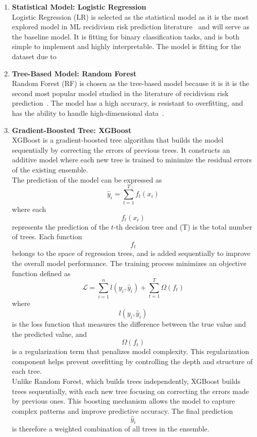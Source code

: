 \documentclass[12pt]{article}
\begin{document}
\begin{enumerate}
  \item \textbf{Statistical Model: Logistic Regression} \\
    \tab Logistic Regression (LR) is selected as the statistical model as it is the most explored model in ML recidivism risk prediction literature~\cite{travaini2022machine} and will serve as the baseline model. It is fitting for binary classification tasks, and is both simple to implement and highly interpretable. The model is fitting for the dataset due to 

  \item \textbf{Tree-Based Model: Random Forest}\\
    \tab Random Forest (RF) is chosen as the tree-based model because it is it is the second most popular model studied in the literature of recidivism risk prediction~\cite{travaini2022machine}. The model has a high accuracy, is resistant to overfitting, and has the ability to handle high-dimensional data~\cite{kovalchuk2023prediction}.

  \item \textbf{Gradient-Boosted Tree: XGBoost}\\
    \tab XGBoost is a gradient-boosted tree algorithm that builds the model sequentially by correcting the errors of previous trees. It constructs an additive model where each new tree is trained to minimize the residual errors of the existing ensemble.\\
    
    The prediction of the model can be expressed as \[ \hat{y}_i = \sum_{t=1}^{T} f_t(x_i) \] where each \[ f_t(x_i) \] represents the prediction of the \(t\)-th decision tree and (T) is the total number of trees. Each function \[ f_t \] belongs to the space of regression trees, and is added sequentially to improve the overall model performance. The training process minimizes an objective function defined as \[ \mathcal{L} = \sum_{i=1}^{n} l(y_i, \hat{y}_i) + \sum_{t=1}^{T} \Omega(f_t) \] where \[ l(y_i, \hat{y}_i) \] is the loss function that measures the difference between the true value and the predicted value, and \[ \Omega(f_t) \] is a regularization term that penalizes model complexity. This regularization component helps prevent overfitting by controlling the depth and structure of each tree.\\
    
    Unlike Random Forest, which builds trees independently, XGBoost builds trees sequentially, with each new tree focusing on correcting the errors made by previous ones. This boosting mechanism allows the model to capture complex patterns and improve predictive accuracy. The final prediction \[ \hat{y}_i \] is therefore a weighted combination of all trees in the ensemble.\\
    

\end{enumerate}
\end{document}

